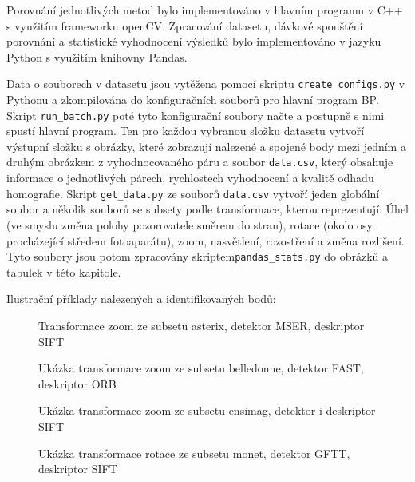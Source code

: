
Porovnání jednotlivých metod bylo implementováno v hlavním programu v C++ s využitím frameworku
openCV. Zpracování datasetu, dávkové spouštění porovnání a statistické vyhodnocení výsledků bylo
implementováno v jazyku Python s využitím knihovny Pandas.


Data o souborech v datasetu jsou vytěžena pomocí skriptu \verb|create_configs.py| v Pythonu a zkompilována do konfiguračních souborů pro hlavní program BP. Skript \verb|run_batch.py| poté tyto konfigurační soubory načte a postupně s nimi spustí hlavní program. Ten pro každou vybranou složku datasetu vytvoří výstupní složku s obrázky, které zobrazují nalezené a spojené body mezi jedním a druhým obrázkem z vyhodnocovaného páru a soubor \verb|data.csv|, který obsahuje informace o jednotlivých párech, rychlostech vyhodnocení a kvalitě odhadu homografie. Skript \verb|get_data.py| ze souborů \verb|data.csv| vytvoří jeden globální soubor a několik souborů se subsety podle transformace, kterou reprezentují: Úhel (ve smyslu změna polohy pozorovatele směrem do stran), rotace (okolo osy procházející středem fotoaparátu), zoom, nasvětlení, rozostření a změna rozlišení. Tyto soubory jsou potom zpracovány skriptem\verb|pandas_stats.py| do obrázků a tabulek v této kapitole.


Ilustrační příklady nalezených a identifikovaných bodů:

\begin{figure}[htp] 
	\label{ex_asterix}
	\caption{Transformace zoom ze subsetu asterix, detektor MSER,
		deskriptor SIFT}
\end{figure}

\begin{figure}[htp] 
	\label{ex_belledonne}
	\caption{Ukázka transformace zoom ze subsetu belledonne, detektor FAST,
		deskriptor ORB}
\end{figure}

\begin{figure}[htp] 
	\label{ex_ensimag}
	\caption{Ukázka transformace zoom ze subsetu ensimag, detektor i 
		deskriptor SIFT}
\end{figure}

\begin{figure}[htp] 
	\label{ex_MONET}
	\caption{Ukázka transformace rotace ze subsetu monet, detektor GFTT, 
		deskriptor SIFT}
\end{figure}

